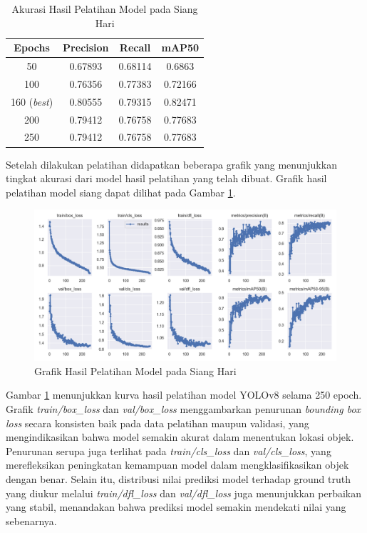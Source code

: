 \begin{table}[H]
	\caption{Akurasi Hasil Pelatihan Model pada Siang Hari}
    \label{table:akurasi model siang}
	\centering
	\begin{tabular}{|c|c|c|c|}
		\hline
		Epochs & Precision & Recall & mAP50 \\ \hline
		50 & 0.67893 & 0.68114 & 0.6863 \\ \hline
		100 & 0.76356 & 0.77383 & 0.72166  \\ \hline
		160 (\emph{best}) & 0.80555 & 0.79315 & 0.82471  \\ \hline
		200 & 0.79412 & 0.76758 & 0.77683 \\ \hline
		250 & 0.79412 & 0.76758 & 0.77683 \\ \hline
	\end{tabular}
\end{table}

Setelah dilakukan pelatihan didapatkan beberapa grafik yang menunjukkan tingkat akurasi dari model hasil pelatihan yang telah dibuat. Grafik hasil pelatihan model siang dapat dilihat pada Gambar \ref{fig:grafik model siang}.
\begin{figure} [H] \centering
  \includegraphics[scale=0.5]{bab4/results_siang.png}
  \caption{Grafik Hasil Pelatihan Model pada Siang Hari}
  \label{fig:grafik model siang}
\end{figure}
Gambar \ref{fig:grafik model siang} menunjukkan kurva hasil pelatihan model YOLOv8 selama 250 epoch. Grafik \emph{train/box\_loss} dan \emph{val/box\_loss} menggambarkan penurunan \emph{bounding box loss} secara konsisten baik pada data pelatihan maupun validasi, yang mengindikasikan bahwa model semakin akurat dalam menentukan lokasi objek. Penurunan serupa juga terlihat pada \emph{train/cls\_loss} dan \emph{val/cls\_loss}, yang merefleksikan peningkatan kemampuan model dalam mengklasifikasikan objek dengan benar. Selain itu, distribusi nilai prediksi model terhadap ground truth yang diukur melalui \emph{train/dfl\_loss} dan \emph{val/dfl\_loss} juga menunjukkan perbaikan yang stabil, menandakan bahwa prediksi model semakin mendekati nilai yang sebenarnya.

